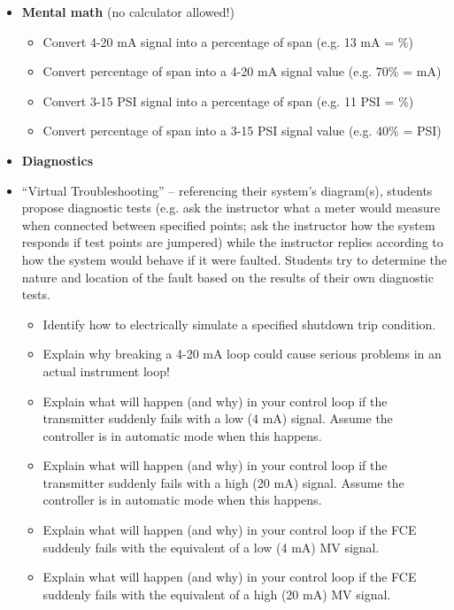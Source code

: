 \filbreak

\begin{itemize}
\item{} {\bf Mental math} (no calculator allowed!)
\begin{itemize}

\item{} Convert 4-20 mA signal into a percentage of span (e.g. 13 mA = \underbar{\hskip 20pt}\%)
\item{} Convert percentage of span into a 4-20 mA signal value (e.g. 70\% = \underbar{\hskip 20pt} mA)
\item{} Convert 3-15 PSI signal into a percentage of span (e.g. 11 PSI = \underbar{\hskip 20pt}\%)
\item{} Convert percentage of span into a 3-15 PSI signal value (e.g. 40\% = \underbar{\hskip 20pt} PSI)
\end{itemize}
\end{itemize}

\filbreak

\begin{itemize}
\item{} {\bf Diagnostics}
\item{} ``Virtual Troubleshooting'' -- referencing their system's diagram(s), students propose diagnostic tests (e.g. ask the instructor what a meter would measure when connected between specified points; ask the instructor how the system responds if test points are jumpered) while the instructor replies according to how the system would behave if it were faulted.  Students try to determine the nature and location of the fault based on the results of their own diagnostic tests.
\begin{itemize}

\item{} Identify how to electrically simulate a specified shutdown trip condition.
\item{} Explain why breaking a 4-20 mA loop could cause serious problems in an actual instrument loop!
\item{} Explain what will happen (and why) in your control loop if the transmitter suddenly fails with a low (4 mA) signal.  Assume the controller is in automatic mode when this happens.
\item{} Explain what will happen (and why) in your control loop if the transmitter suddenly fails with a high (20 mA) signal.  Assume the controller is in automatic mode when this happens.
\item{} Explain what will happen (and why) in your control loop if the FCE suddenly fails with the equivalent of a low (4 mA) MV signal.
\item{} Explain what will happen (and why) in your control loop if the FCE suddenly fails with the equivalent of a high (20 mA) MV signal.
\end{itemize}
\end{itemize}


